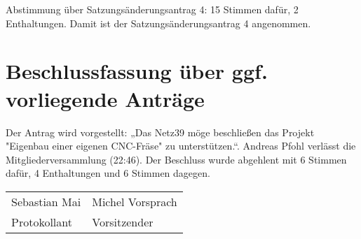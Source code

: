 \documentclass[a4paper,12pt,titlepage]{scrartcl}
\begin{document}
Abstimmung über Satzungsänderungsantrag 4: 15 Stimmen dafür, 2 Enthaltungen. Damit ist der Satzungsänderungsantrag 4 angenommen.

\section{Beschlussfassung über ggf. vorliegende Anträge}

Der Antrag wird vorgestellt: „Das Netz39 möge beschließen das Projekt "Eigenbau einer eigenen CNC-Fräse" zu unterstützen.“.
Andreas Pfohl verlässt die Mitgliederversammlung (22:46).
Der Beschluss wurde abgehlent mit 6 Stimmen dafür, 4 Enthaltungen und 6 Stimmen dagegen.

\nopagebreak
\vspace{10\baselineskip}
\begin{tabularx}{\textwidth}[b]{X X}
	\hline
	Sebastian Mai & Michel Vorsprach \\
	Protokollant & Vorsitzender
\end{tabularx}

\appendix

\end{document}
